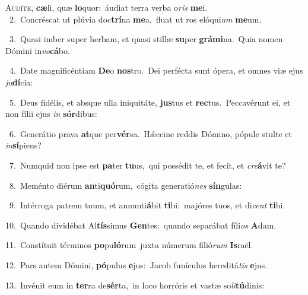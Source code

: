 \lettrine{\initial\textcolor{\initialcolor}{A}}{udíte,} \textbf{cæ}\-li, quæ \textbf{lo}\-quor:~\star áudiat terra verba o\textit{ris} \textbf{me}\-i.\\
{\numbfont\textcolor{\numbcolor}{~2.}}~Concréscat ut plúvia doc\-\textbf{trí}\-na \textbf{me}\-a,~\star fluat ut ros elóqui\textit{um} \textbf{me}\-um.\par
{\numbfont\textcolor{\numbcolor}{~3.}}~Quasi imber super herbam, et quasi stillæ \textbf{su}\-per \textbf{grá}\-\textbf{mi}na.~\star Quia nomen Dómini in\-\textit{vo}\-\textbf{cá}bo.\par
{\numbfont\textcolor{\numbcolor}{~4.}}~Date magnificéntiam \textbf{De}\-o \textbf{nos}\-tro.~\star Dei perfécta sunt ópera, et omnes viæ ejus \textit{ju}\-\textbf{dí}cia:\par
{\numbfont\textcolor{\numbcolor}{~5.}}~Deus fidélis, et absque ulla iniquitáte, \textbf{jus}\-tus et \textbf{rec}\-tus.~\star Peccavérunt ei, et non fílii ejus \textit{in} \textbf{sór}\-dibus:\par
{\numbfont\textcolor{\numbcolor}{~6.}}~Generátio prava \textbf{at}\-que per\-\textbf{vér}\-sa.~\star Hǽccine reddis Dómino, pópule stulte et \textit{in}\-\textbf{sí}piens?\par
{\numbfont\textcolor{\numbcolor}{~7.}}~Numquid non ipse est \textbf{pa}\-ter \textbf{tu}\-us,~\star qui possédit te, et fecit, et \textit{cre}\-\textbf{á}vit te?\par
{\numbfont\textcolor{\numbcolor}{~8.}}~Meménto diérum \textbf{an}\-ti\-\textbf{quó}\-rum,~\star cógita generatió\textit{nes} \textbf{sín}\-gulas:\par
{\numbfont\textcolor{\numbcolor}{~9.}}~Intérroga patrem tuum, et annunti\-\textbf{á}\-bit \textbf{ti}\-bi:~\star majóres tuos, et di\textit{cent} \textbf{ti}\-bi.\par
{\numbfont\textcolor{\numbcolor}{10.}}~Quando dividébat Al\-\textbf{tís}\-simus \textbf{Gen}\-tes:~\star quando separábat fíli\textit{os} \textbf{A}\-dam.\par
{\numbfont\textcolor{\numbcolor}{11.}}~Constítuit términos \textbf{po}\-pu\-\textbf{ló}\-rum~\star juxta númerum filió\textit{rum} \textbf{Is}\-raël.\par
{\numbfont\textcolor{\numbcolor}{12.}}~Pars autem Dómini, \textbf{pó}\-pulus \textbf{e}\-jus:~\star Jacob funículus hereditá\textit{tis} \textbf{e}\-jus.\par
{\numbfont\textcolor{\numbcolor}{13.}}~Invénit eum in \textbf{ter}\-ra de\-\textbf{sér}\-ta,~\star in loco horróris et vastæ so\-\textit{li}\-\textbf{tú}dinis:\par
